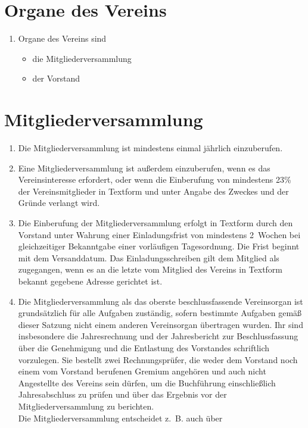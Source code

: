 \documentclass[a4paper,12pt]{scrartcl}
\begin{document}
\section{Organe des Vereins}
\begin{enumerate}
  \item Organe des Vereins sind
  \begin{itemize}
    \item die Mitgliederversammlung
    \item der Vorstand
  \end{itemize}
\end{enumerate}

\section{Mitgliederversammlung}
\begin{enumerate}
  \item Die Mitgliederversammlung ist mindestens einmal jährlich einzuberufen.
  \item Eine Mitgliederversammlung ist außerdem einzuberufen, wenn es das
    Vereinsinteresse erfordert, oder wenn die Einberufung von mindestens 23\%
    der Vereinsmitglieder in Textform und unter Angabe des Zweckes und der
    Gründe verlangt wird.
  \item Die Einberufung der Mitgliederversammlung erfolgt in Textform durch den
    Vorstand unter Wahrung einer Einladungsfrist von mindestens 2~Wochen bei
    gleichzeitiger Bekanntgabe einer vorläufigen Tagesordnung. Die Frist beginnt
    mit dem Versanddatum. Das Einladungsschreiben gilt dem Mitglied als
    zugegangen, wenn es an die letzte vom Mitglied des Vereins in Textform
    bekannt gegebene Adresse gerichtet ist.
  \item Die Mitgliederversammlung als das oberste beschlussfassende Vereinsorgan
    ist grundsätzlich für alle Aufgaben zuständig, sofern bestimmte Aufgaben
    gemäß dieser Satzung nicht einem anderen Vereinsorgan übertragen wurden.
    Ihr sind insbesondere die Jahresrechnung und der Jahresbericht zur
    Beschlussfassung über die Genehmigung und die Entlastung des Vorstandes
    schriftlich vorzulegen. Sie bestellt zwei Rechnungsprüfer, die weder dem
    Vorstand noch einem vom Vorstand berufenen Gremium angehören und auch nicht
    Angestellte des Vereins sein dürfen, um die Buchführung einschließlich
    Jahresabschluss zu prüfen und über das Ergebnis vor der
    Mitgliederversammlung zu berichten.\\
    Die Mitgliederversammlung entscheidet z.~B. auch über

\end{enumerate}
\end{document}
